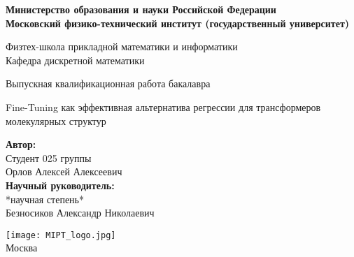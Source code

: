 \begin{center}
    \large\textbf{Министерство образования и науки Российской Федерации \\
    Московский физико-технический институт (государственный
    университет)} \\
    \vspace{1cm}

    Физтех-школа прикладной математики и информатики \\

    Кафедра дискретной математики \\

    \vspace{3em}

    Выпускная квалификационная работа бакалавра
\end{center}

\begin{center}
    \vspace{\fill}
    \LARGE{Fine-Tuning как эффективная альтернатива регрессии для трансформеров молекулярных структур}

    \vspace{\fill}
\end{center}


\begin{flushright}
    \textbf{Автор:} \\
    Студент 025 группы \\
    Орлов Алексей Алексеевич \\
    \vspace{2em}
    \textbf{Научный руководитель:} \\
    *научная степень* \\
    Безносиков Александр Николаевич \\
\end{flushright}

\vspace{7em}

\begin{center}
    \texttt{[image: MIPT\_logo.jpg]}\\
    Москва \the\year{}
\end{center}

\thispagestyle{empty}

\newpage
\setcounter{page}{2}
\fancyfoot[c]{\thepage}
\fancyhead[R]{}